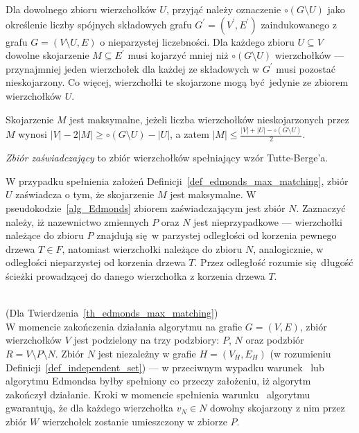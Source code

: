 {  Dla dowolnego zbioru wierzchołków $U$, przyjąć należy oznaczenie $\circ (G \setminus U)$ jako określenie liczby spójnych składowych grafu $G^\prime=(V^\prime, E^\prime)$ zaindukowanego z grafu $G=(V \setminus U, E)$ o nieparzystej liczebności.
  Dla każdego zbioru $U \subseteq V$ dowolne skojarzenie $M \subseteq E^\prime$ musi kojarzyć mniej niż $\circ (G \setminus U)$ wierzchołków --- przynajmniej jeden wierzchołek dla każdej ze składowych w $G^\prime$ musi pozostać nieskojarzony.
  Co więcej, wierzchołki te skojarzone mogą być jedynie ze zbiorem wierzchołków $U$.
  \begin{definition}
    Skojarzenie $M$ jest maksymalne, jeżeli liczba wierzchołków nieskojarzonych przez $M$ wynosi $|V| - 2|M| \geq \circ (G \setminus U) - |U|$, a zatem $|M|\leq \frac{|V|+|U| - \circ (G \setminus U)}{2}$.
  \end{definition}
  \begin{definition}
  \emph{Zbiór zaświadczający} to zbiór wierzchołków spełniający wzór Tutte-Berge'a.
  \end{definition}
  W przypadku spełnienia założeń Definicji~\ref{def_edmonds_max_matching}, zbiór $U$ zaświadcza o tym, że skojarzenie $M$ jest maksymalne.
  W pseudokodzie~\ref{alg_Edmonds} zbiorem zaświadczającym jest zbiór $N$.
  Zaznaczyć należy, iż nazewnictwo zmiennych $P$ oraz $N$ jest nieprzypadkowe --- wierzchołki należące do zbioru $P$ znajdują się w parzystej odległości od korzenia pewnego drzewa $T \in F$, natomiast wierzchołki należące do zbioru $N$, analogicznie, w odległości nieparzystej od korzenia drzewa $T$.
  Przez odległość rozumie się długość ścieżki prowadzącej do danego wierzchołka z korzenia drzewa $T$.\\\\
  \begin{bproof} (Dla Twierdzenia~\ref{th_edmonds_max_matching})\\
    W momencie zakończenia działania algorytmu na grafie $G=(V, E)$, zbiór wierzchołków $V$ jest podzielony na trzy podzbiory: $P$, $N$ oraz podzbiór $R = V \setminus P \setminus N$.
    Zbiór $N$ jest niezależny w grafie $H=(V_H, E_H)$ (w rozumieniu Definicji~\ref{def_independent_set}) --- w przeciwnym wypadku warunek~ lub~ algorytmu Edmondsa byłby spełniony co przeczy założeniu, iż algorytm zakończył działanie.
    Kroki w momencie spełnienia warunku~ algorytmu gwarantują, że dla każdego wierzchołka $v_N \in N$ dowolny skojarzony z nim przez zbiór $W$ wierzchołek zostanie umieszczony w zbiorze $P$.

\end{bproof}}

